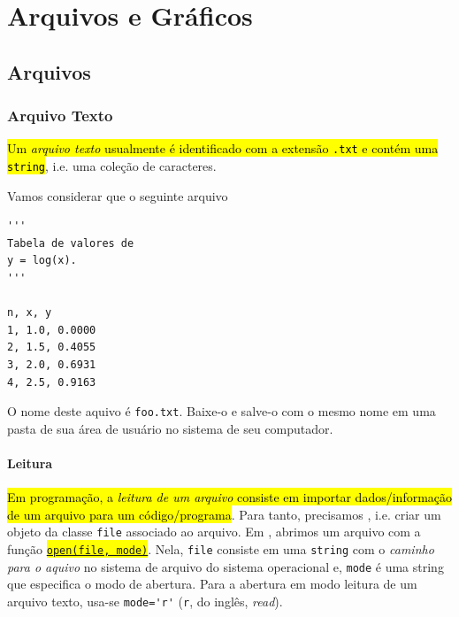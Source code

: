 
\chapter{Arquivos e Gráficos}\label{cap_ag}
\thispagestyle{fancy}

\section{Arquivos}\label{cap_ag_sec_arq}

\subsection{Arquivo Texto}

\hl{Um \emph{arquivo texto} usualmente é identificado com a extensão {\lstinline+.txt+} e contém uma {\lstinline+string+}}, i.e. uma coleção de caracteres.

Vamos considerar que o seguinte arquivo
\begin{lstlisting}[caption = foo.txt, label=cap_ag_sec_arq:cod:foo.txt]
'''
Tabela de valores de
y = log(x).
'''

n, x, y
1, 1.0, 0.0000
2, 1.5, 0.4055
3, 2.0, 0.6931
4, 2.5, 0.9163
\end{lstlisting}
O nome deste aquivo é \lstinline+foo.txt+. Baixe-o e salve-o com o mesmo nome em uma pasta de sua área de usuário no sistema de seu computador.

\subsubsection{Leitura}

\hl{Em programação, a \emph{leitura de um arquivo} consiste em importar dados/informação de um arquivo para um código/programa}. Para tanto, precisamos , i.e. criar um objeto da classe {\lstinline+file+} associado ao arquivo. Em {\python}, abrimos um arquivo com a função \hl{{\href{https://docs.python.org/3/library/functions.html\#open}{\lstinline+open(file, mode)+}}}. Nela, \lstinline+file+ consiste em uma \lstinline+string+ com o \emph{caminho para o aquivo} no sistema de arquivo do sistema operacional e, \lstinline+mode+ é uma string que especifica o modo de abertura. Para a abertura em modo leitura de um arquivo texto, usa-se \lstinline+mode='r'+ (\lstinline+r+, do inglês, \textit{read}).

